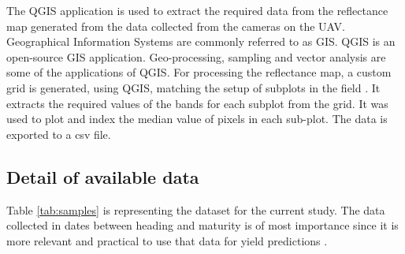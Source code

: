 \documentclass[sigconf, nonacm, natbib, screen, balance=False]{acmart}
\begin{document}
The QGIS application is used to extract the required data from the reflectance map generated from the data collected from the cameras on the UAV. Geographical Information Systems are commonly referred to as GIS. QGIS is an open-source GIS application. Geo-processing, sampling and vector analysis are some of the applications of QGIS. For processing the reflectance map, a custom grid is generated, using QGIS, matching the setup of subplots in the field \citep{lied}. It extracts the required values of the bands for each subplot from the grid. It was used to plot and index the median value of pixels in each sub-plot. The data is exported to a csv file.

\subsection{Detail of available data}\label{sec:detail_data}

Table \ref{tab:samples} is representing the dataset for the current study. The data collected in dates between heading and maturity is of most importance since it is more relevant and practical to use that data for yield predictions \cite{shafiee2021}.
\end{document}
